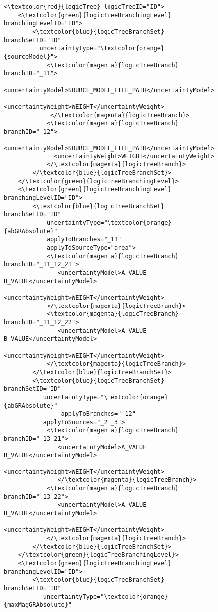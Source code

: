 \begin{figure}[htbp]
\begin{center}
\begin{Verbatim}[frame=single, commandchars=\\\{\},fontsize=\scriptsize, samepage=true]
<\textcolor{red}{logicTree} logicTreeID="ID">
	<\textcolor{green}{logicTreeBranchingLevel} branchingLevelID="ID">
		<\textcolor{blue}{logicTreeBranchSet} branchSetID="ID"
		  uncertaintyType="\textcolor{orange}{sourceModel}">
			<\textcolor{magenta}{logicTreeBranch} branchID="_11">
			   <uncertaintyModel>SOURCE_MODEL_FILE_PATH</uncertaintyModel>
			   <uncertaintyWeight>WEIGHT</uncertaintyWeight>
			 </\textcolor{magenta}{logicTreeBranch}> 
			<\textcolor{magenta}{logicTreeBranch} branchID="_12">
			  <uncertaintyModel>SOURCE_MODEL_FILE_PATH</uncertaintyModel>
			  <uncertaintyWeight>WEIGHT</uncertaintyWeight>
			</\textcolor{magenta}{logicTreeBranch}>
		</\textcolor{blue}{logicTreeBranchSet}>
	</\textcolor{green}{logicTreeBranchingLevel}>
	<\textcolor{green}{logicTreeBranchingLevel} branchingLevelID="ID">
		<\textcolor{blue}{logicTreeBranchSet} branchSetID="ID" 
		    uncertaintyType="\textcolor{orange}{abGRAbsolute}"
		    applyToBranches="_11" 
		    applyToSourceType="area">
			<\textcolor{magenta}{logicTreeBranch} branchID="_11_12_21">
			   <uncertaintyModel>A_VALUE B_VALUE</uncertaintyModel>
			   <uncertaintyWeight>WEIGHT</uncertaintyWeight>
			</\textcolor{magenta}{logicTreeBranch}>
			<\textcolor{magenta}{logicTreeBranch} branchID="_11_12_22">
			   <uncertaintyModel>A_VALUE B_VALUE</uncertaintyModel>
			   <uncertaintyWeight>WEIGHT</uncertaintyWeight>
			</\textcolor{magenta}{logicTreeBranch}>  
		</\textcolor{blue}{logicTreeBranchSet}>
		<\textcolor{blue}{logicTreeBranchSet} branchSetID="ID" 
		   uncertaintyType="\textcolor{orange}{abGRAbsolute}"
	            applyToBranches="_12" 
		   applyToSources="_2 _3">
			<\textcolor{magenta}{logicTreeBranch} branchID="_13_21">
			   <uncertaintyModel>A_VALUE B_VALUE</uncertaintyModel>
			   <uncertaintyWeight>WEIGHT</uncertaintyWeight>
			   </\textcolor{magenta}{logicTreeBranch}>
			<\textcolor{magenta}{logicTreeBranch} branchID="_13_22">
			   <uncertaintyModel>A_VALUE B_VALUE</uncertaintyModel>
			   <uncertaintyWeight>WEIGHT</uncertaintyWeight>
			</\textcolor{magenta}{logicTreeBranch}>
		</\textcolor{blue}{logicTreeBranchSet}>
	</\textcolor{green}{logicTreeBranchingLevel}>
	<\textcolor{green}{logicTreeBranchingLevel} branchingLevelID="ID">
		<\textcolor{blue}{logicTreeBranchSet} branchSetID="ID" 
		   uncertaintyType="\textcolor{orange}{maxMagGRAbsolute}" 

\end{Verbatim}
\end{center}
\end{figure}

